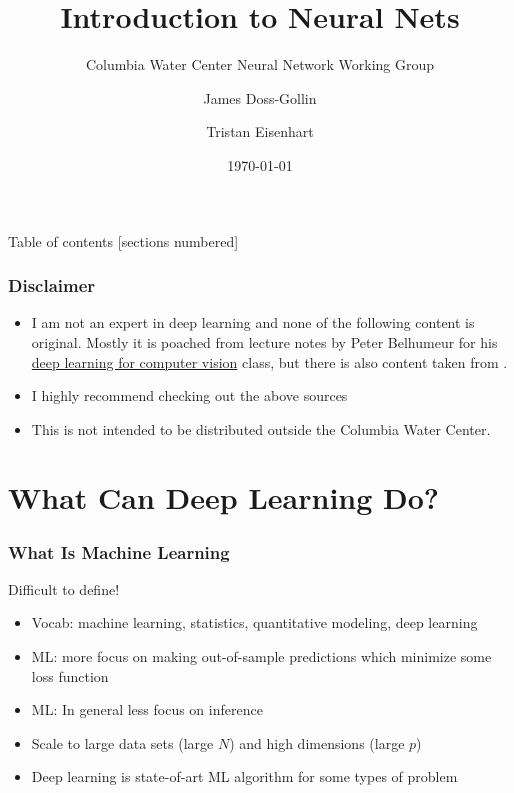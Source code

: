 \documentclass[10pt]{beamer}
\title{Introduction to Neural Nets}
\subtitle{Columbia Water Center Neural Network Working Group}
\date{\today}
\author{James Doss-Gollin \and Tristan Eisenhart}
\institute{Columbia University}
\begin{document}
\maketitle

\begin{frame}{Table of contents}
  [sections numbered]
  \tableofcontents[hideallsubsections]
\end{frame}


\begin{frame}
	\frametitle{Disclaimer}
	\begin{itemize}
		\item I am not an expert in deep learning and none of the following content is original.
		Mostly it is poached from lecture notes by Peter Belhumeur for his \href{www.deeplearningforcomputervision.com/}{deep learning for computer vision} class, but there is also content taken from \citet{Friedman2001,James2013,Goodfellow-et-al-2016}.
		\item I highly recommend checking out the above sources
		\item This is not intended to be distributed outside the Columbia Water Center.
	\end{itemize}
\end{frame}

\section{What Can Deep Learning Do?}

\begin{frame}
	\frametitle{What Is Machine Learning}
	Difficult to define!
	\begin{itemize}
		\item Vocab: machine learning, statistics, quantitative modeling, deep learning
		\item ML: more focus on making out-of-sample predictions which minimize some loss function
		\item ML: In general less focus on inference
		\item Scale to large data sets (large $N$) and high dimensions (large $p$)
		\item Deep learning is state-of-art ML algorithm for some types of problem
	\end{itemize}
\end{frame}
\end{document}
